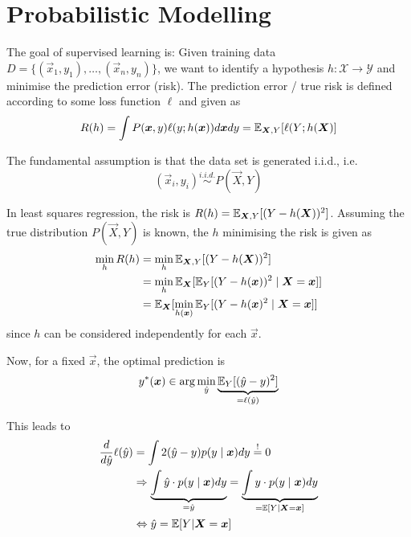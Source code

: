 \section{Probabilistic Modelling}
The goal of supervised learning is:
Given training data $D = \{(\vec{x}_1, y_1), \dotsc, (\vec{x}_n, y_n)\}$,
we want to identify a hypothesis $h : \mathcal{X} \to \mathcal{Y}$
and minimise the prediction error (risk).
The prediction error / true risk is
defined according to some loss function
$\ell$ and given as
\begin{equation*}
    R(h) = \int{P(\boldsymbol{x}, y) \ell(y; h(\boldsymbol{x})) d\boldsymbol{x} dy}
        = \mathbb{E}_{\boldsymbol{X}, Y}[\ell(Y; h(\boldsymbol{X})]
\end{equation*}

The fundamental assumption is that
the data set is generated i.i.d.,
i.e.
\begin{equation*}
    (\vec{x}_i, y_i) \overset{i.i.d.}{\sim} P(\vec{X}, Y)
\end{equation*}

In least squares regression,
the risk is
$R(h) = \mathbb{E}_{\boldsymbol{X}, Y}[(Y - h(\boldsymbol{X}))^2]$.
Assuming the true distribution $P(\vec{X}, Y)$ is known,
the $h$ minimising the risk is given as
\begin{align*}
    \min_h{R(h)}
    &= \min_h{\mathbb{E}_{\boldsymbol{X}, Y}[(Y - h(\boldsymbol{X}))^2]} \\
    &= \min_h{\mathbb{E}_{\boldsymbol{X}}[\mathbb{E}_Y[(Y - h(\boldsymbol{x}))^2 \mid \boldsymbol{X} = \boldsymbol{x}]]} \\
    &= \mathbb{E}_{\boldsymbol{X}}[
        \min_{h(\boldsymbol{x})}{\mathbb{E}_Y[(Y-h(\boldsymbol{x})^2 \mid \boldsymbol{X} = \boldsymbol{x}]}
    ]
\end{align*}
since $h$ can be considered independently for each $\vec{x}$.

Now, for a fixed $\vec{x}$, the optimal prediction is
\begin{equation*}
    y^*(\boldsymbol{x}) \in \arg\min_{\hat{y}}{
        \underbrace{\mathbb{E}_Y[(\hat{y} - y)^2]}_{= \ell(\hat{y})}
    }
\end{equation*}

This leads to
\begin{align*}
    \frac{d}{d \hat{y}} \ell(\hat{y}) &= \int{2 (\hat{y} - y) p(y \mid \boldsymbol{x}) dy} \overset{!}{=} 0 \\
    &\Rightarrow \underbrace{\int{\hat{y} \cdot p(y \mid \boldsymbol{x}) dy}}_{=\hat{y}} = \underbrace{\int{y \cdot p(y \mid \boldsymbol{x}) dy}}_{= \mathbb{E}[Y \mid \boldsymbol{X} = \boldsymbol{x}]} \\
    &\Leftrightarrow \hat{y} = \mathbb{E}[Y | \boldsymbol{X} = \boldsymbol{x}]
\end{align*}

